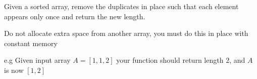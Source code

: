 Given a sorted array, remove the duplicates in place such that each element appears only once and return the new length.

Do not allocate extra space from another array, you must do this in place with constant memory

e.g
Given input array $A=[1,1,2]$
your function should return length $2$, and $A$ is now $[1,2]$
